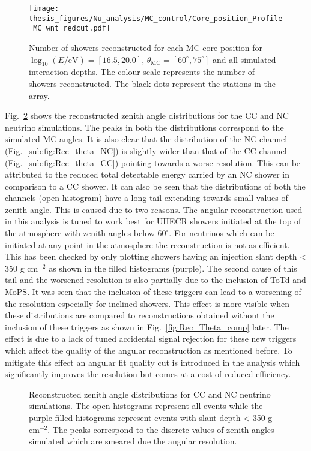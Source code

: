 \begin{figure}[h!]
  \centering
  \texttt{[image: thesis\_figures/Nu\_analysis/MC\_control/Core\_position\_Profile\_MC\_wnt\_redcut.pdf]}
  \caption{Number of showers reconstructed for each MC core position for $\log_{10}(E/\text{eV}) = [16.5, 20.0]$, $\theta_{\mathrm{MC}} = [60^{\circ}, 75^{\circ}]$ and all simulated interaction depths. The colour scale represents the number of showers reconstructed. The black dots represent the stations in the array.}
  \label{fig:Core_XY_rec}
\end{figure}
Fig.~\ref{fig:Rec_Theta} shows the reconstructed zenith angle distributions for the CC and NC neutrino simulations. The peaks in both the distributions correspond to the simulated MC angles. It is also clear that the distribution of the NC channel (Fig.~\ref{sub:fig:Rec_theta_NC}) is slightly wider than that of the CC channel (Fig.~\ref{sub:fig:Rec_theta_CC}) pointing towards a worse resolution. This can be attributed to the reduced total detectable energy carried by an NC shower in comparison to a CC shower. It can also be seen that the distributions of both the channels (open histogram) have a long tail extending towards small values of zenith angle. This is caused due to two reasons. The angular reconstruction used in this analysis is tuned to work best for UHECR showers initiated at the top of the atmosphere with zenith angles below $60^{\circ}$. For neutrinos which can be initiated at any point in the atmosphere the reconstruction is not as efficient. This has been checked by only plotting showers having an injection slant depth < 350 g cm$^{-2}$ as shown in the filled histograms (purple). The second cause of this tail and the worsened resolution is also partially due to the inclusion of ToTd and MoPS. It was seen that the inclusion of these triggers can lead to a worsening of the resolution especially for inclined showers. This effect is more visible when these distributions are compared to reconstructions obtained without the inclusion of these triggers as shown in Fig.~\ref{fig:Rec_Theta_comp} later. The effect is due to a lack of tuned accidental signal rejection for these new triggers which affect the quality of the angular reconstruction as mentioned before. To mitigate this effect an angular fit quality cut is introduced in the analysis which significantly improves the resolution but comes at a cost of reduced efficiency.

\begin{figure}[h!]
  \centering
  \hfill
  \caption{Reconstructed zenith angle distributions for CC and NC neutrino simulations. The open histograms represent all events while the purple filled histograms represent events with slant depth < 350 g cm$^{-2}$. The peaks correspond to the discrete values of zenith angles simulated which are smeared due the angular resolution.}
  \label{fig:Rec_Theta}
\end{figure}

